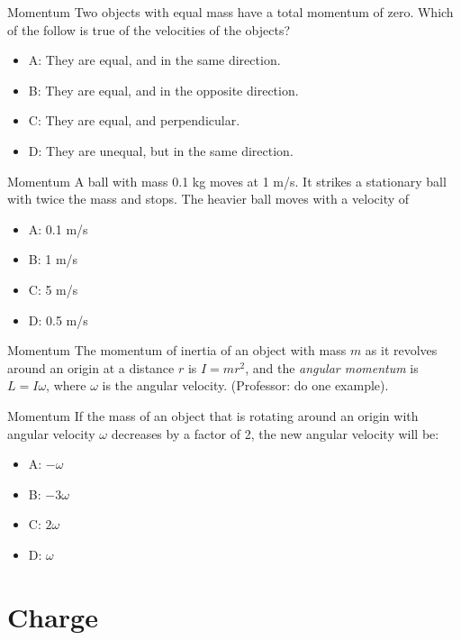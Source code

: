 \documentclass{beamer}
\begin{document}
\begin{frame}{Momentum}
Two objects with equal mass have a total momentum of zero.  Which of the follow is true of the velocities of the objects?
\begin{itemize}
\item A: They are equal, and in the same direction.
\item B: They are equal, and in the opposite direction.
\item C: They are equal, and perpendicular.
\item D: They are unequal, but in the same direction.
\end{itemize}
\end{frame}

\begin{frame}{Momentum}
A ball with mass 0.1 kg moves at 1 m/s.  It strikes a stationary ball with twice the mass and stops.  The heavier ball moves with a velocity of
\begin{itemize}
\item A: 0.1 m/s
\item B: 1 m/s
\item C: 5 m/s
\item D: 0.5 m/s
\end{itemize}
\end{frame}

\begin{frame}{Momentum}
The momentum of inertia of an object with mass $m$ as it revolves around an origin at a distance $r$ is $I = mr^2$, and the \textit{angular momentum} is $L = I \omega$, where $\omega$ is the angular velocity. (Professor: do one example).
\end{frame}

\begin{frame}{Momentum}
If the mass of an object that is rotating around an origin with angular velocity $\omega$ decreases by a factor of 2, the new angular velocity will be:
\begin{itemize}
\item A: $-\omega$
\item B: $-3\omega$
\item C: $2\omega$
\item D: $\omega$
\end{itemize}
\end{frame}

\section{Charge}
\end{document}
